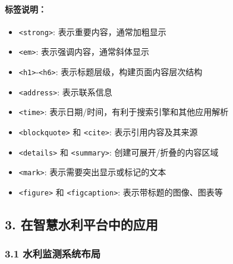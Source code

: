 \paragraph{标签说明：}\label{ux6807ux7b7eux8bf4ux660e-1}

\begin{itemize}
\tightlist
\item
  \passthrough{\lstinline!<strong>!}: 表示重要内容，通常加粗显示
\item
  \passthrough{\lstinline!<em>!}: 表示强调内容，通常斜体显示
\item
  \passthrough{\lstinline!<h1>!}-\passthrough{\lstinline!<h6>!}:
  表示标题层级，构建页面内容层次结构
\item
  \passthrough{\lstinline!<address>!}: 表示联系信息
\item
  \passthrough{\lstinline!<time>!}:
  表示日期/时间，有利于搜索引擎和其他应用解析
\item
  \passthrough{\lstinline!<blockquote>!} 和
  \passthrough{\lstinline!<cite>!}: 表示引用内容及其来源
\item
  \passthrough{\lstinline!<details>!} 和
  \passthrough{\lstinline!<summary>!}: 创建可展开/折叠的内容区域
\item
  \passthrough{\lstinline!<mark>!}: 表示需要突出显示或标记的文本
\item
  \passthrough{\lstinline!<figure>!} 和
  \passthrough{\lstinline!<figcaption>!}: 表示带标题的图像、图表等
\end{itemize}

\subsection{3.
在智慧水利平台中的应用}\label{ux5728ux667aux6167ux6c34ux5229ux5e73ux53f0ux4e2dux7684ux5e94ux7528}

\subsubsection{3.1
水利监测系统布局}\label{ux6c34ux5229ux76d1ux6d4bux7cfbux7edfux5e03ux5c40}

